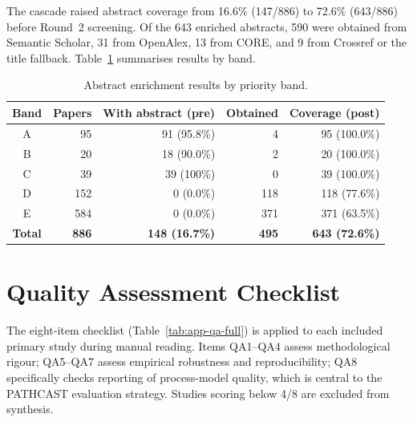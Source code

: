 The cascade raised abstract coverage from 16.6\% (147/886) to 72.6\%
(643/886) before Round~2 screening. Of the 643 enriched abstracts, 590 were
obtained from Semantic Scholar, 31 from OpenAlex, 13 from CORE, and 9 from
Crossref or the title fallback.
Table~\ref{tab:app-enrichment-stats} summarises results by band.

\begin{table}[htbp]
\centering
\caption{Abstract enrichment results by priority band.}
\label{tab:app-enrichment-stats}
\small
\setlength{\tabcolsep}{4pt}
\begin{tabular}{c r r r r}
\toprule
\textbf{Band} & \textbf{Papers} & \textbf{With abstract (pre)} &
  \textbf{Obtained} & \textbf{Coverage (post)} \\
\midrule
A & 95  & 91 (95.8\%) & 4  & 95  (100.0\%) \\
B & 20  & 18 (90.0\%) & 2  & 20  (100.0\%) \\
C & 39  & 39 (100\%)  & 0  & 39  (100.0\%) \\
D & 152 & 0   (0.0\%) & 118 & 118 (77.6\%) \\
E & 584 & 0   (0.0\%) & 371 & 371 (63.5\%) \\
\midrule
\textbf{Total} & \textbf{886} & \textbf{148 (16.7\%)} &
  \textbf{495} & \textbf{643 (72.6\%)} \\
\bottomrule
\end{tabular}
\end{table}

\section{Quality Assessment Checklist}
\label{app:slr-qa}

The eight-item checklist (Table~\ref{tab:app-qa-full}) is applied to each
included primary study during manual reading. Items QA1--QA4 assess
methodological rigour; QA5--QA7 assess empirical robustness and
reproducibility; QA8 specifically checks reporting of process-model quality,
which is central to the PATHCAST evaluation strategy.
Studies scoring below 4/8 are excluded from synthesis.

